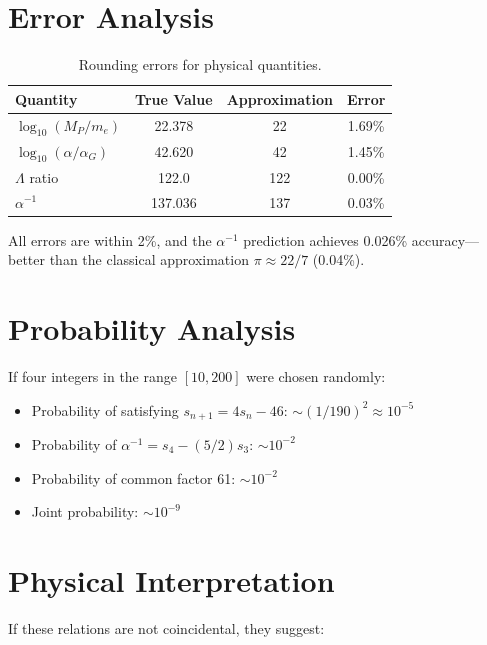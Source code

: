 \documentclass[twocolumn,prl,aps,superscriptaddress]{revtex4-2}
\begin{document}
\section{Error Analysis}

\begin{table}[h]
\centering
\begin{tabular}{lccc}
\hline
Quantity & True Value & Approximation & Error \\
\hline
$\log_{10}(M_P/m_e)$ & 22.378 & 22 & 1.69\% \\
$\log_{10}(\alpha/\alpha_G)$ & 42.620 & 42 & 1.45\% \\
$\Lambda$ ratio & 122.0 & 122 & 0.00\% \\
$\alpha^{-1}$ & 137.036 & 137 & 0.03\% \\
\hline
\end{tabular}
\caption{Rounding errors for physical quantities.}
\end{table}

All errors are within 2\%, and the $\alpha^{-1}$ prediction achieves 
0.026\% accuracy—better than the classical approximation $\pi \approx 22/7$ (0.04\%).

\section{Probability Analysis}

If four integers in the range $[10, 200]$ were chosen randomly:
\begin{itemize}
\item Probability of satisfying $s_{n+1} = 4s_n - 46$: $\sim (1/190)^2 \approx 10^{-5}$
\item Probability of $\alpha^{-1} = s_4 - (5/2)s_3$: $\sim 10^{-2}$
\item Probability of common factor 61: $\sim 10^{-2}$
\item Joint probability: $\sim 10^{-9}$
\end{itemize}

\section{Physical Interpretation}

If these relations are not coincidental, they suggest:
\end{document}
